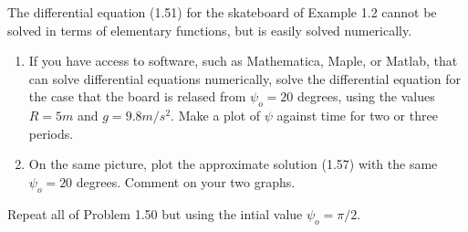 \begin{tcolorbox}[title=Problem 50, breakable]
    The differential equation (1.51) for the skateboard 
    of Example 1.2 cannot be solved in terms of elementary functions,
    but is easily solved numerically.
    \begin{enumerate}
        \item If you have access to software, such as Mathematica, Maple, or Matlab, that can 
        solve differential equations numerically, solve the differential equation for the case that the board 
        is relased from $\psi_o = 20$ degrees, using the values $R = 5m$ and $g = 9.8 m/s^2$.
        Make a plot of $\psi$ against time for two or three periods.
        \item On the same picture, plot the approximate solution (1.57) with the same $\psi_o = 20$ degrees.
        Comment on your two graphs. 
    \end{enumerate}
\end{tcolorbox}

\begin{tcolorbox}[title=Problem 51, breakable]
    Repeat all of Problem 1.50 but using the 
    intial value $\psi_o = \pi/2$.
\end{tcolorbox}